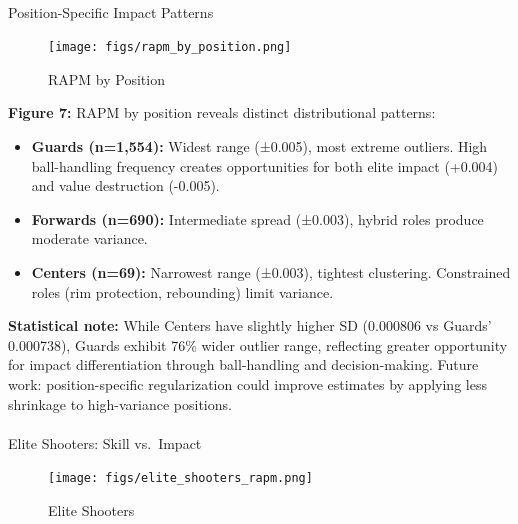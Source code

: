 \documentclass[
  letterpaper,
  DIV=11,
  numbers=noendperiod]{scrartcl}
\makeatletter
\let\oldparagraph\paragraph
\renewcommand{\paragraph}{
    \@ifstar
      \xxxParagraphStar
      \xxxParagraphNoStar
  }
\newcommand{\xxxParagraphStar}[1]{\oldparagraph*{#1}\mbox{}}
\newcommand{\xxxParagraphNoStar}[1]{\oldparagraph{#1}\mbox{}}
\providecommand{\tightlist}{%
  \setlength{\itemsep}{0pt}\setlength{\parskip}{0pt}}
\makeatother
\begin{document}
\paragraph{Position-Specific Impact
Patterns}\label{position-specific-impact-patterns}

\begin{figure}[H]

{\centering \texttt{[image: figs/rapm\_by\_position.png]}

}

\caption{RAPM by Position}

\end{figure}%

\textbf{Figure 7:} RAPM by position reveals distinct distributional
patterns:

\begin{itemize}
\tightlist
\item
  \textbf{Guards (n=1,554):} Widest range (±0.005), most extreme
  outliers. High ball-handling frequency creates opportunities for both
  elite impact (+0.004) and value destruction (-0.005).
\item
  \textbf{Forwards (n=690):} Intermediate spread (±0.003), hybrid roles
  produce moderate variance.
\item
  \textbf{Centers (n=69):} Narrowest range (±0.003), tightest
  clustering. Constrained roles (rim protection, rebounding) limit
  variance.
\end{itemize}

\textbf{Statistical note:} While Centers have slightly higher SD
(0.000806 vs Guards' 0.000738), Guards exhibit 76\% wider outlier range,
reflecting greater opportunity for impact differentiation through
ball-handling and decision-making. Future work: position-specific
regularization could improve estimates by applying less shrinkage to
high-variance positions.

\paragraph{Elite Shooters: Skill
vs.~Impact}\label{elite-shooters-skill-vs.-impact}

\begin{figure}[H]

{\centering \texttt{[image: figs/elite\_shooters\_rapm.png]}

}

\caption{Elite Shooters}

\end{figure}%
\end{document}
